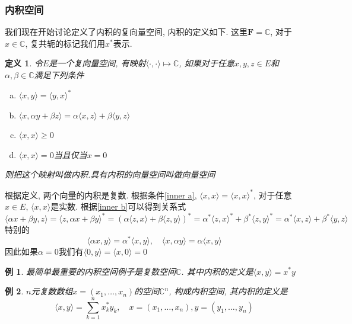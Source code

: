 \documentclass[a4paper,11pt]{article}
\newtheorem{definition}{\hspace{2em}定义}[section]
\newtheorem{example}{例}[section]
\begin{document}
\subsubsection*{内积空间}
我们现在开始讨论定义了内积的复向量空间, 内积的定义如下. 这里$\mathbf{F}=\mathbb{C}$, 对于$x\in\mathbb{C}$, 复共轭的标记我们用$x^*$表示.
\begin{definition}\label{inner def}
  令$E$是一个复向量空间, 有映射$\langle\cdot,\cdot\rangle\mapsto\mathbb{C}$, 如果对于任意$x,y,z\in E$和$\alpha,\beta\in \mathbb{C}$满足下列条件
  \begin{enumerate}[(a)]
    \item\label{inner a} $\langle x,y\rangle=\langle y,x\rangle^*$
    \item\label{inner b} $\langle x,\alpha y+\beta z\rangle=\alpha\langle x,z\rangle+\beta\langle y,z\rangle$
    \item $\langle x,x\rangle\geq 0$
    \item $\langle x,x\rangle=0$当且仅当$x=0$
  \end{enumerate}
  则把这个映射叫做内积.具有内积的向量空间叫做向量空间
\end{definition}
根据定义, 两个向量的内积是复数. 根据条件\ref{inner a}, $\langle x,x\rangle=\langle x,x\rangle^*$, 对于任意$x\in E$, $\langle x,x\rangle$是实数. 根据\ref{inner b}可以得到关系式
\begin{equation*}
  \langle\alpha x+\beta y,z\rangle=\langle z,\alpha x+\beta y\rangle^*=(\alpha\langle z,x\rangle+\beta\langle z,y\rangle)^*=\alpha^*\langle z,x\rangle^*+\beta^*\langle z,y\rangle^*=\alpha^*\langle x,z\rangle+\beta^*\langle y,z\rangle
\end{equation*}
特别的
\begin{equation*}
  \langle\alpha x,y\rangle=\alpha^*\langle x,y\rangle,\quad \langle x,\alpha y\rangle=\alpha\langle x,y\rangle
\end{equation*}
因此如果$\alpha=0$我们有$\langle 0,y\rangle=\langle x,0\rangle=0$
\begin{example}
  最简单最重要的内积空间例子是复数空间$\mathbb{C}$. 其中内积的定义是$\langle x,y\rangle=x^*y$
\end{example}
\begin{example}
  $n$元复数数组$x=(x_1,\dots,x_n)$的空间$\mathbb{C}^n$, 构成内积空间, 其内积的定义是
  \begin{equation*}
    \langle x,y\rangle=\sum_{k=1}^{n}x_k^* y_k,\quad x=(x_1,\dots,x_n),y=(y_1,\dots,y_n)
  \end{equation*}
\end{example}
\end{document}
